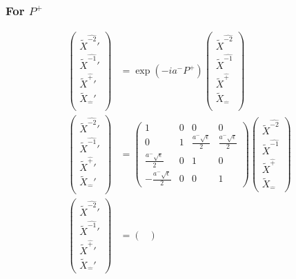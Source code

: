 \documentclass[]{article}
\numberwithin{equation}{section}
\begin{document}
{{\subsubsection{For $P^{+}$}
\begin{align}
\begin{pmatrix}
    \tilde{X}^{\hat{-2}}'\\
    \tilde{X}^{\hat{-1}}'\\
    \tilde{X}^{\hat{+}}'\\
    \tilde{X}_{\hat{-}}'\\
    \end{pmatrix}&= \exp{\left(-ia^{-}P^{+}\right)}\begin{pmatrix}
    \tilde{X}^{\hat{-2}}\\
    \tilde{X}^{\hat{-1}}\\
    \tilde{X}^{\hat{+}}\\
    \tilde{X}_{\hat{-}}\\
    \end{pmatrix}\\
    \begin{pmatrix}
    \tilde{X}^{\hat{-2}}'\\
    \tilde{X}^{\hat{-1}}'\\
    \tilde{X}^{\hat{+}}'\\
    \tilde{X}_{\hat{-}}'\\
    \end{pmatrix}&= \begin{pmatrix}
        1&0&0&0\\
        0&1&\frac{a^{-}\sqrt{\epsilon}}{2}&\frac{a^{-}\sqrt{\epsilon}}{2}\\
        \frac{a^{-}\sqrt{\epsilon}}{2}&0&1&0\\
        -\frac{a^{-}\sqrt{\epsilon}}{2}&0&0&1
    \end{pmatrix}\begin{pmatrix}
    \tilde{X}^{\hat{-2}}\\
    \tilde{X}^{\hat{-1}}\\
    \tilde{X}^{\hat{+}}\\
    \tilde{X}_{\hat{-}}
    \end{pmatrix}\\
    \begin{pmatrix}
    \tilde{X}^{\hat{-2}}'\\
    \tilde{X}^{\hat{-1}}'\\
    \tilde{X}^{\hat{+}}'\\
    \tilde{X}_{\hat{-}}'
    \end{pmatrix}&= \begin{pmatrix}

\end{pmatrix}
\end{align}}}
\end{document}

